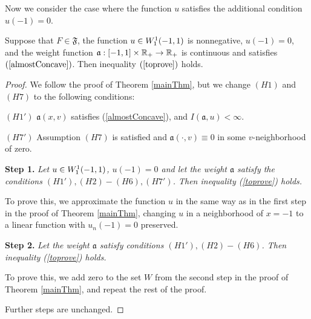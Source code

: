 \medskip

Now we consider the case where the function $u$ satisfies the additional condition $u(-1) = 0$.
\begin{thm}
Suppose that $F \in \mathfrak{F}$, the function $u \in W_1^1(-1, 1)$ is nonnegative, $u(-1) = 0$,
and the weight function $\mathfrak a: [-1, 1] \times \mathbb R_+ \to \mathbb R_+$ is continuous
and satisfies $(\ref{almostConcave})$.
Then inequality $(\ref{toprove})$ holds.
\end{thm}

\begin{proof}
We follow the proof of Theorem \ref{mainThm},
but we change $(H1)$ and $(H7)$ to the following conditions:

\bigskip
\noindent
$(H1')$ $\mathfrak a(x, v)$ satisfies (\ref{almostConcave}), and $I(\mathfrak a, u) < \infty$.

\bigskip
\noindent
$(H7')$ Assumption $(H7)$ is satisfied and $\mathfrak a(\cdot, v) \equiv 0$ in some $v$-neighborhood of zero.

\bigskip
{\bf Step 1.} {\it Let $u \in W_1^1(-1, 1)$, $u(-1) = 0$ and let the weight $\mathfrak a$ satisfy the conditions $(H1'), (H2)-(H6), (H7')$.
Then inequality (\ref{toprove}) holds.}

To prove this, we approximate the function $u$ in the same way as in the first step in the proof of Theorem \ref{mainThm},
changing $u$ in a neighborhood of $x = -1$ to a linear function with $u_n(-1) = 0$ preserved.

\bigskip
{\bf Step 2.} {\it Let the weight $\mathfrak a$ satisfy conditions $(H1'), (H2)-(H6)$.
Then inequality (\ref{toprove}) holds.}

To prove this, we add zero to the set $W$ from the second step in the proof of Theorem \ref{mainThm},
and repeat the rest of the proof.

\medskip

Further steps are unchanged.
\end{proof}

